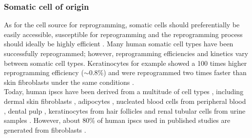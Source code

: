 

\subsubsection{Somatic cell of origin}

As for the cell source for reprogramming, somatic cells should preferentially be easily accessible, susceptible for reprogramming and the reprogramming process should ideally be highly efficient \cite{brouwer2016choices}. 
Many human somatic cell types have been successfully reprogrammed; however, reprogramming efficiencies and kinetics vary between somatic cell types. 
Keratinocytes for example showed a 100 times higher reprogramming efficiency ($\sim$0.8\%) and were reprogrammed two times faster than skin fibroblasts under the same conditions \cite{aasen2008efficient}. \\

Today, human \glspl{ipsc} have been derived from a multitude of cell types \cite{doss2019current}, including dermal skin fibroblasts \cite{takahashi2007induction, yu2007induced}, adipocytes \cite{sugii2010human}, nucleated blood cells from peripheral blood \cite{loh2009generation, seki2010generation}, dental pulp \cite{yan2010ips},
keratinocytes from hair follicles \cite{aasen2008efficient} and
renal tubular cells from urine samples \cite{cao2018generation}.
However, about 80\% of human \glspl{ipsc} used in published studies are generated from fibroblasts \cite{takahashi2016decade}. \\

